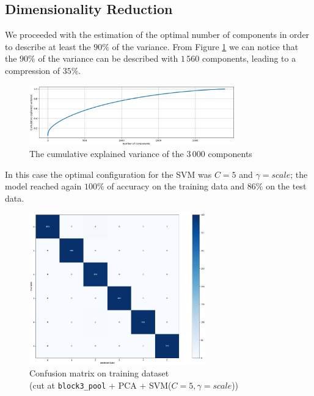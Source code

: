 \documentclass[compsoc]{IEEEtran}
\begin{document}
\subsection{Dimensionality Reduction}

We proceeded with the estimation of the optimal number of components in order to describe at least the $90\%$ of the variance.
From Figure \ref{fig:var3} we can notice that the $90\%$ of the variance can be described with $1\,560$ components, leading to a compression of $35\%$.

\begin{figure}[ht!]
\centering                                                                        
\includegraphics[width=3.5in]{../images/var-3.png}
\captionsetup{justification=centering}                                                                                         
\caption{The cumulative explained variance of the $3\,000$ components}
\label{fig:var3}                                                                                                                               
\end{figure}



In this case the optimal configuration for the SVM was $C=5$ and $\gamma=scale$; the model reached again $100\%$ of accuracy on the training data and $86\%$ on the test data. 

\begin{figure}[ht!]
\centering                                                                        
\includegraphics[width=3in]{../images/cm3-pca-train.png}
\captionsetup{justification=centering}                                                                                         
\caption{Confusion matrix on training dataset \\ (cut at \texttt{block3\_pool} + PCA + SVM($C=5, \gamma=scale$))}
\label{fig:cm3-pca-train}                                                                                                                               
\end{figure}
\end{document}

